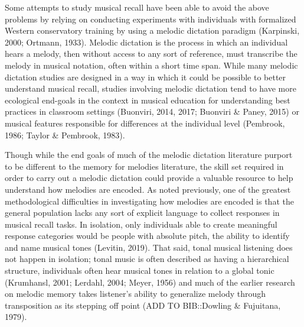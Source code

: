\documentclass[english,man]{apa6}
\begin{document}
Some attempts to study musical recall have been able to avoid the above problems by relying on conducting experiments with individuals with formalized Western conservatory training by using a melodic dictation paradigm (Karpinski, 2000; Ortmann, 1933).
Melodic dictation is the process in which an individual hears a melody, then without access to any sort of reference, must transcribe the melody in musical notation, often within a short time span.
While many melodic dictation studies are designed in a way in which it could be possible to better understand musical recall, studies involving melodic dictation tend to have more ecological end-goals in the context in musical education for understanding best practices in classroom settings (Buonviri, 2014, 2017; Buonviri \& Paney, 2015) or musical features responsible for differences at the individual level (Pembrook, 1986; Taylor \& Pembrook, 1983).

Though while the end goals of much of the melodic dictation literature purport to be different to the memory for melodies literature, the skill set required in order to carry out a melodic dictation could provide a valuable resource to help understand how melodies are encoded.
As noted previously, one of the greatest methodological difficulties in investigating how melodies are encoded is that the general population lacks any sort of explicit language to collect responses in musical recall tasks.
In isolation, only individuals able to create meaningful response categories would be people with absolute pitch, the ability to identify and name musical tones (Levitin, 2019).
That said, tonal musical listening does not happen in isolation; tonal music is often described as having a hierarchical structure, individuals often hear musical tones in relation to a global tonic (Krumhansl, 2001; Lerdahl, 2004; Meyer, 1956) and much of the earlier research on melodic memory takes listener's ability to generalize melody through transposition as its stepping off point (ADD TO BIB::Dowling \& Fujuitana, 1979).
\end{document}
